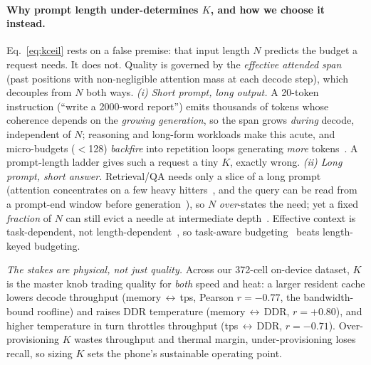 \documentclass[sigconf, anonymous=false, screen=true]{acmart}
\begin{document}
\paragraph{Why prompt length under-determines $K$, and how we choose it instead.} Eq.~\eqref{eq:kceil} rests on a false premise: that input length $N$ predicts the budget a request needs. It does not. Quality is governed by the \emph{effective attended span} (past positions with non-negligible attention mass at each decode step), which decouples from $N$ both ways. \emph{(i) Short prompt, long output.} A 20-token instruction (``write a 2000-word report'') emits thousands of tokens whose coherence depends on the \emph{growing generation}, so the span grows \emph{during} decode, independent of $N$; reasoning and long-form workloads make this acute, and micro-budgets ($<$128) \emph{backfire} into repetition loops generating \emph{more} tokens~\cite{cai2025rkv}. A prompt-length ladder gives such a request a tiny $K$, exactly wrong. \emph{(ii) Long prompt, short answer.} Retrieval/QA needs only a slice of a long prompt (attention concentrates on a few heavy hitters~\cite{zhang2023h2o}, and the query can be read from a prompt-end window before generation~\cite{li2024snapkv}), so $N$ \emph{over}-states the need; yet a fixed \emph{fraction} of $N$ can still evict a needle at intermediate depth~\cite{feng2025adakv}. Effective context is task-dependent, not length-dependent~\cite{hsieh2024ruler}, so task-aware budgeting~\cite{zhou2024dynamickv} beats length-keyed budgeting.

\emph{The stakes are physical, not just quality.} Across our 372-cell on-device dataset, $K$ is the master knob trading quality for \emph{both} speed and heat: a larger resident cache lowers decode throughput (memory\,$\leftrightarrow$\,tps, Pearson $r{=}{-}0.77$, the bandwidth-bound roofline) and raises DDR temperature (memory\,$\leftrightarrow$\,DDR, $r{=}{+}0.80$), and higher temperature in turn throttles throughput (tps\,$\leftrightarrow$\,DDR, $r{=}{-}0.71$). Over-provisioning $K$ wastes throughput and thermal margin, under-provisioning loses recall, so sizing $K$ sets the phone's sustainable operating point.
\end{document}

